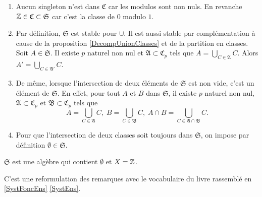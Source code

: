 \begin{rems}
 \begin{enumerate}
  \item  Aucun singleton n'est dans $\mathfrak{C}$ car les modulos sont non nuls. En revanche $\mathbb{Z} \in \mathfrak{C} \subset \mathfrak{S}$ car c'est la classe de $0$ modulo $1$.

  \item Par définition, $\mathfrak{S}$ est stable pour $\cup$. Il est aussi stable par complémentation à cause de la proposition \ref{DecompUnionClasses} et de la partition en classes. Soit $A\in \mathfrak{S}$. Il existe $p$ naturel non nul et $\mathfrak{A}\subset \mathfrak{C}_p$ tels que $A = \bigcup_{C \in \mathfrak{A}} C$. Alors $A' = \bigcup_{C \in \mathfrak{A}'} C$.

  \item De même, lorsque l'intersection de deux éléments de $\mathfrak{S}$ est non vide, c'est un élément de $\mathfrak{S}$. En effet, pour tout $A$ et $B$ dans $\mathfrak{S}$, il existe $p$ naturel non nul, $\mathfrak{A}\subset \mathfrak{C}_p$ et $\mathfrak{B}\subset \mathfrak{C}_p$ tels que
  \begin{displaymath}
   A = \bigcup_{C \in \mathfrak{A}} C, \; B = \bigcup_{C \in \mathfrak{B}} C, \; A\cap B = \bigcup_{C \in \mathfrak{A}\cap \mathfrak{B}} C.
  \end{displaymath}

  \item Pour que l'intersection de deux classes soit toujours dans $\mathfrak{S}$, on impose par définition $\emptyset \in \mathfrak{S}$.
\end{enumerate}
\end{rems}

\begin{prop}
  $\mathfrak{S}$ est une algèbre qui contient $\emptyset$ et $X=\mathbb{Z}$.
\end{prop}
\begin{demo}
 C'est une reformulation des remarques avec le vocabulaire du livre rassemblé en \ref{SystFoncEns} \ref{SystEns}.
\end{demo}

